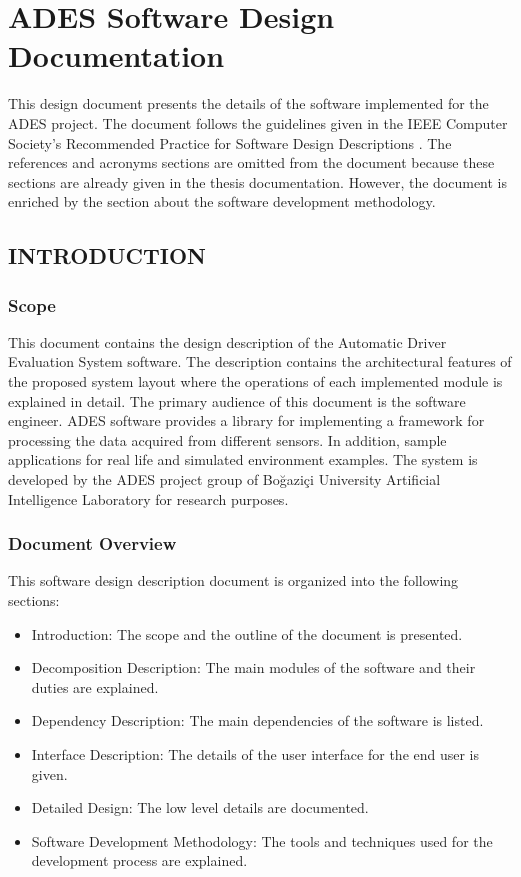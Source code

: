 \documentclass[a4paper,oneside,12pt]{report}
\begin{document}
\appendix\chapter{ADES Software Design Documentation}
This design document presents the details of the software implemented for the ADES project. The document follows the guidelines given in the IEEE Computer Society's Recommended Practice for Software Design Descriptions \cite{ieee_computer_society_ieee_1998}. The references and acronyms sections are omitted from the document because these sections are already given in the thesis documentation. However, the document is enriched by the section about the software development methodology.
\section{INTRODUCTION}
\subsection{Scope}
This document contains the design description of the Automatic Driver Evaluation System software. The description contains the architectural features of the proposed system layout where the operations of each implemented module is explained in detail. The primary audience of this document is the software engineer. ADES software provides a library for implementing a framework for processing the data acquired from different sensors. In addition, sample applications for real life and simulated environment examples. The system is developed by the ADES project group of Bo{\u g}azi{\c c}i University Artificial Intelligence Laboratory for research purposes.
\subsection{Document Overview}
This software design description document is organized into the following sections:
\begin{itemize}
  \item Introduction: The scope and the outline of the document is presented.
	\item Decomposition Description: The main modules of the software and their duties are explained.
	\item Dependency Description: The main dependencies of the software is listed.
	\item Interface Description: The details of the user interface for the end user is given.
	\item Detailed Design: The low level details are documented.
	\item Software Development Methodology: The tools and techniques used for the development process are explained.
\end{itemize}
\end{document}
